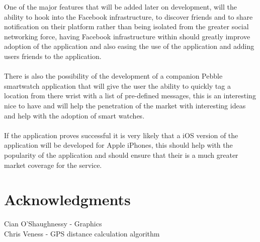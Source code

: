 \documentclass[a0,landscape]{a0poster}
\begin{document}
\begin{multicols}{4}
One of the major features that will be added later on development, will the ability to hook into the Facebook infrastructure, to discover friends and to share notification on their platform rather than being isolated from the greater social networking force, having Facebook infrastructure within should greatly improve adoption of the application and also easing the use of the application and adding users friends to the application.\\
\\
There is also the possibility of the development of a companion Pebble smartwatch application that will give the user the ability to quickly tag a location from there wrist with a list of pre-defined messages, this is an interesting nice to have and will help the penetration of the market with interesting ideas and help with the adoption of smart watches.\\
\\
If the application proves successful it is very likely that a iOS version of the application will be developed for Apple iPhones, this should help with the popularity of the application and should ensure that their is a much greater market coverage for the service.

\section{Acknowledgments}

Cian O'Shaughnessy - Graphics\\
Chris Veness - GPS distance calculation algorithm\\


\end{multicols}
\end{document}
